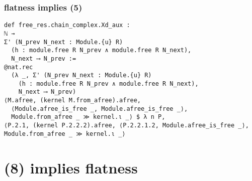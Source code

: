 \documentclass[aspectratio=169]{beamer}
\begin{document}
\begin{frame}[fragile]
\frametitle{flatness implies (5)}
\begin{minipage}{0.1\textwidth}
\end{minipage}%
\begin{minipage}{0.9\textwidth}
\begin{lstlisting}
def free_res.chain_complex.Xd_aux : 
ℕ → 
Σ' (N_prev N_next : Module.{u} R) 
  (h : module.free R N_prev ∧ module.free R N_next), 
  N_next ⟶ N_prev :=
@nat.rec 
  (λ _, Σ' (N_prev N_next : Module.{u} R) 
    (h : module.free R N_prev ∧ module.free R N_next), 
    N_next ⟶ N_prev)
⟨M.afree, (kernel M.from_afree).afree, 
  ⟨Module.afree_is_free _, Module.afree_is_free _⟩, 
  Module.from_afree _ ≫ kernel.ι _⟩ $ λ n P, 
⟨P.2.1, (kernel P.2.2.2).afree, ⟨P.2.2.1.2, Module.afree_is_free _⟩, Module.from_afree _ ≫ kernel.ι _⟩
\end{lstlisting}
\end{minipage}%

\end{frame}

\section*{(8) implies flatness}
\end{document}
